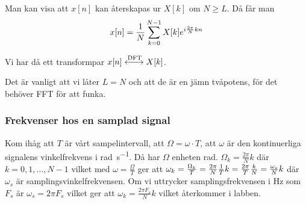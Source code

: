 \documentclass[a4paper]{article}
\begin{document}
Man kan visa att \(
    x[n]
\) kan återskapas ur \(
    X[k]
\) om \(
    N \geq L
\). Då får man \[
    x[n] = \frac{1}{N} \sum_{k=0}^{N-1} X[k] e^{i \frac{2\pi}{N} k n}
\] 

Vi har då ett transformpar \(
    x[n] \xleftrightarrow{\text{DFT} } X[k]
\).

Det är vanligt att vi låter \(
    L = N
\) och att de är en jämn tvåpotens, för det behöver FFT för att funka.

\subsubsection{Frekvenser hos en samplad signal}

Kom ihåg att \(
    T
\) är vårt sampelintervall, att \(
    \Omega = \omega \cdot T
\), att \(
    \omega
\) är den kontinuerliga signalens vinkelfrekvens i \si{\radian\per\second}. 
Då har \(
    \Omega
\) enheten \si{\radian}. \(
    \Omega_k = \frac{2\pi}{N} k
\) där \(
    k = 0, 1, \dots, N-1
\) vilket med \(
    \omega = \frac{\Omega}{T} 
\) ger att \(
    \omega_k = \frac{\Omega_k}{T} 
        = \frac{2\pi}{N} \frac{1}{T} k
        = \frac{2\pi}{T} \frac{k}{N} 
        = \frac{\omega_s}{N} k
\) där \(
    \omega_s
\) är samplingsvinkelfrekvensen. Om vi uttrycker samplingsfrekvensen i 
\si{\hertz} som \(
    F_s
\) är \(
    \omega_s = 2\pi F_s
\) vilket ger att \(
    \omega_k = \frac{2\pi F_s}{N} k 
\) vilket återkommer i labben. 
\end{document}
